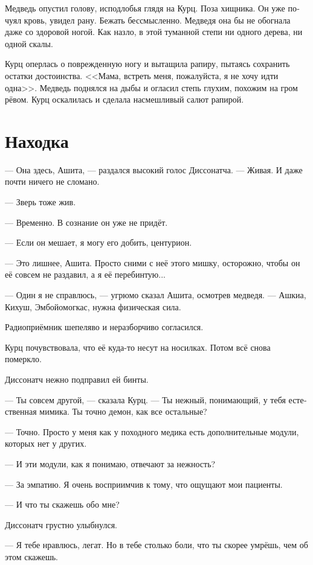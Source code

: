 \documentclass[a4paper,12pt,fleqn]{book}\usepackage{cooltooltips}\usepackage{polyglossia}\setdefaultlanguage[babelshorthands=true]{russian}\setotherlanguage{english}\defaultfontfeatures{Ligatures=TeX,Mapping=tex-text} \usepackage{xcolor}\definecolor{lightgray}{HTML}{bbbbbb}\color{lightgray}\newcommand{\ml}[3]{\textenglish{\textcolor{black}{#3}}}
\newcommand{\asterism}{\vspace{1em}{\centering\Large\bfseries$\ast~\ast~\ast$\par}\vspace{1em}}
\begin{document}
Медведь опустил голову, исподлобья глядя на Курц.
Поза хищника.
Он уже почуял кровь, увидел рану.
Бежать бессмысленно.
Медведя она бы не обогнала даже со здоровой ногой.
Как назло, в этой туманной степи ни одного дерева, ни одной скалы.

Курц оперлась о поврежденную ногу и вытащила рапиру, пытаясь сохранить остатки достоинства.
<<Мама, встреть меня, пожалуйста, я не хочу идти одна>>.
Медведь поднялся на дыбы и огласил степь глухим, похожим на гром рёвом.
Курц оскалилась и сделала насмешливый салют рапирой.

\section{Находка}

--- Она здесь, Ашита, --- раздался высокий голос Диссонатча.
--- Живая.
И даже почти ничего не сломано.

--- Зверь тоже жив.

--- Временно.
В сознание он уже не придёт.

--- Если он мешает, я могу его добить, центурион.

--- Это лишнее, Ашита.
Просто сними с неё этого мишку, осторожно, чтобы он её совсем не раздавил, а я её перебинтую...

--- Один я не справлюсь, --- угрюмо сказал Ашита, осмотрев медведя.
--- Ашкиа, Кихуш, Эмбойомогкас, нужна физическая сила. %

Радиоприёмник шепеляво и неразборчиво согласился.

Курц почувствовала, что её куда-то несут на носилках.
Потом всё снова померкло.

\asterism

Диссонатч нежно подправил ей бинты.

--- Ты совсем другой, --- сказала Курц.
--- Ты нежный, понимающий, у тебя естественная мимика.
Ты точно демон, как все остальные?

--- Точно.
Просто у меня как у походного медика есть дополнительные модули, которых нет у других.

--- И эти модули, как я понимаю, отвечают за нежность?

--- За эмпатию.
Я очень восприимчив к тому, что ощущают мои пациенты.

--- И что ты скажешь обо мне?

Диссонатч грустно улыбнулся.

--- Я тебе нравлюсь, легат.
Но в тебе столько боли, что ты скорее умрёшь, чем об этом скажешь.
\end{document}
